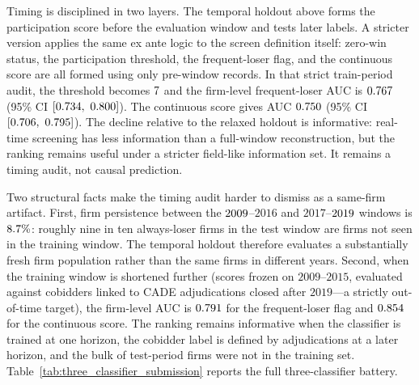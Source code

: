 Timing is disciplined in two layers. The temporal holdout above
forms the participation score before the evaluation window and
tests later labels. A stricter version applies the same ex ante
logic to the screen definition itself: zero-win status, the
participation threshold, the frequent-loser flag, and the
continuous score are all formed using only pre-window records.
In that strict train-period audit, the threshold becomes
$7$ and the firm-level frequent-loser AUC is
$0.767$ (95\% CI $[0.734,\ 0.800]$). The
continuous score gives AUC $0.750$ (95\% CI
$[0.706,\ 0.795]$). The decline relative to the relaxed
holdout is informative: real-time screening has less information
than a full-window reconstruction, but the ranking remains
useful under a stricter field-like information set. It remains a
timing audit, not causal prediction.

Two structural facts make the timing audit harder to dismiss as
a same-firm artifact. First, firm persistence between the
$2009$--$2016$ and $2017$--$2019$ windows is
$8.7\%$: roughly nine in ten always-loser firms in the
test window are firms not seen in the training window. The
temporal holdout therefore evaluates a substantially fresh firm
population rather than the same firms in different years. Second,
when the training window is shortened further (scores frozen on
$2009$--$2015$, evaluated against cobidders linked to CADE
adjudications closed after $2019$---a strictly out-of-time
target), the firm-level AUC is $0.791$ for the
frequent-loser flag and $0.854$ for the
continuous score. The ranking remains informative when the
classifier is trained at one horizon, the cobidder label is
defined by adjudications at a later horizon, and the bulk of
test-period firms were not in the training set.
Table~\ref{tab:three_classifier_submission} reports the full
three-classifier battery.

